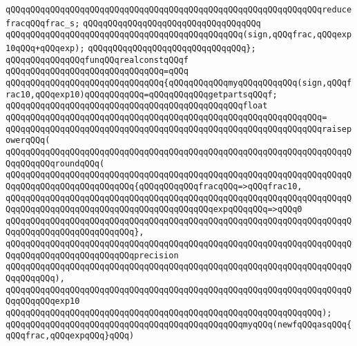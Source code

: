 \verb|qQQqqQQqqQQqqQQqqQQqqQQqqQQqqQQqqQQqqQQqqQQqqQQqqQQqqQQqqQQqqQQqreducefracqQQqfrac_s;|\newline
\verb|qQQqqQQqqQQqqQQqqQQqqQQqqQQqqQQqqQQq|\newline
\verb|qQQqqQQqqQQqqQQqqQQqqQQqqQQqqQQqqQQqqQQqqQQqqQQq(sign,qQQqfrac,qQQqexp10qQQq+qQQqexp);|\newline
\verb|qQQqqQQqqQQqqQQqqQQqqQQqqQQqqQQq};|\newline
\newline
\verb|qQQqqQQqqQQqqQQqfunqQQqrealconstqQQqf|\newline
\verb|qQQqqQQqqQQqqQQqqQQqqQQqqQQqqQQq=qQQq|\newline
\verb|qQQqqQQqqQQqqQQqqQQqqQQqqQQqqQQq{qQQqqQQqqQQqmyqQQqqQQqqQQq(sign,qQQqfrac10,qQQqexp10)qQQqqQQqqQQq=qQQqqQQqqQQqgetpartsqQQqf;|\newline
\newline
\verb|qQQqqQQqqQQqqQQqqQQqqQQqqQQqqQQqqQQqqQQqqQQqqQQqfloat|\newline
\verb|qQQqqQQqqQQqqQQqqQQqqQQqqQQqqQQqqQQqqQQqqQQqqQQqqQQqqQQqqQQqqQQq=|\newline
\verb|qQQqqQQqqQQqqQQqqQQqqQQqqQQqqQQqqQQqqQQqqQQqqQQqqQQqqQQqqQQqqQQqraisepowerqQQq(|\newline
\verb|qQQqqQQqqQQqqQQqqQQqqQQqqQQqqQQqqQQqqQQqqQQqqQQqqQQqqQQqqQQqqQQqqQQqqQQqqQQqqQQqroundqQQq(|\newline
\verb|qQQqqQQqqQQqqQQqqQQqqQQqqQQqqQQqqQQqqQQqqQQqqQQqqQQqqQQqqQQqqQQqqQQqqQQqqQQqqQQqqQQqqQQqqQQqqQQq{qQQqqQQqqQQqfracqQQq=>qQQqfrac10,|\newline
\verb|qQQqqQQqqQQqqQQqqQQqqQQqqQQqqQQqqQQqqQQqqQQqqQQqqQQqqQQqqQQqqQQqqQQqqQQqqQQqqQQqqQQqqQQqqQQqqQQqqQQqqQQqqQQqqQQqexpqQQqqQQq=>qQQq0|\newline
\verb|qQQqqQQqqQQqqQQqqQQqqQQqqQQqqQQqqQQqqQQqqQQqqQQqqQQqqQQqqQQqqQQqqQQqqQQqqQQqqQQqqQQqqQQqqQQqqQQq},|\newline
\verb|qQQqqQQqqQQqqQQqqQQqqQQqqQQqqQQqqQQqqQQqqQQqqQQqqQQqqQQqqQQqqQQqqQQqqQQqqQQqqQQqqQQqqQQqqQQqqQQqprecision|\newline
\verb|qQQqqQQqqQQqqQQqqQQqqQQqqQQqqQQqqQQqqQQqqQQqqQQqqQQqqQQqqQQqqQQqqQQqqQQqqQQqqQQq),|\newline
\verb|qQQqqQQqqQQqqQQqqQQqqQQqqQQqqQQqqQQqqQQqqQQqqQQqqQQqqQQqqQQqqQQqqQQqqQQqqQQqqQQqexp10|\newline
\verb|qQQqqQQqqQQqqQQqqQQqqQQqqQQqqQQqqQQqqQQqqQQqqQQqqQQqqQQqqQQqqQQq);|\newline
\newline
\verb|qQQqqQQqqQQqqQQqqQQqqQQqqQQqqQQqqQQqqQQqqQQqqQQqmyqQQq(newfqQQqasqQQq{qQQqfrac,qQQqexpqQQq}qQQq)|\newline
